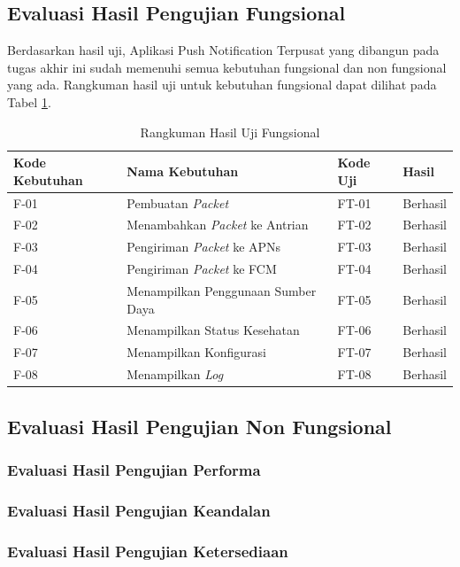 \subsection{Evaluasi Hasil Pengujian Fungsional}
\par Berdasarkan hasil uji, Aplikasi Push Notification Terpusat yang dibangun pada tugas akhir ini sudah memenuhi semua kebutuhan fungsional dan non fungsional yang ada. Rangkuman hasil uji untuk kebutuhan fungsional dapat dilihat pada Tabel \ref{t:eval_f}.
\begin{longtable}{|p{1.5cm}|p{3cm}|p{1.5cm}|p{1.5cm}|}
	\caption{Rangkuman Hasil Uji Fungsional} \label{t:eval_f} \\ \hline
	\rowcolor{lightgray} Kode Kebutuhan & Nama Kebutuhan & Kode Uji & Hasil \\ \hline
	F-01 & Pembuatan \textit{Packet} & FT-01 & Berhasil \\ \hline
	F-02 & Menambahkan \textit{Packet} ke Antrian & FT-02 & Berhasil \\ \hline
	F-03 & Pengiriman \textit{Packet} ke APNs & FT-03 & Berhasil \\ \hline
	F-04 & Pengiriman \textit{Packet} ke FCM & FT-04 & Berhasil \\ \hline
	F-05 & Menampilkan Penggunaan Sumber Daya & FT-05 & Berhasil \\ \hline
	F-06 & Menampilkan Status Kesehatan & FT-06 & Berhasil \\ \hline
	F-07 & Menampilkan Konfigurasi & FT-07 & Berhasil \\ \hline
	F-08 & Menampilkan \textit{Log} & FT-08 & Berhasil \\ \hline
\end{longtable}

\subsection{Evaluasi Hasil Pengujian Non Fungsional}

\subsubsection{Evaluasi Hasil Pengujian Performa}

\subsubsection{Evaluasi Hasil Pengujian Keandalan}

\subsubsection{Evaluasi Hasil Pengujian Ketersediaan}

